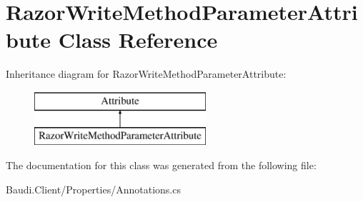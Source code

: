 \hypertarget{class_razor_write_method_parameter_attribute}{}\section{Razor\+Write\+Method\+Parameter\+Attribute Class Reference}
\label{class_razor_write_method_parameter_attribute}
Inheritance diagram for Razor\+Write\+Method\+Parameter\+Attribute\+:\begin{figure}[H]
\begin{center}
\leavevmode
\includegraphics[height=2.000000cm]{class_razor_write_method_parameter_attribute}
\end{center}
\end{figure}


The documentation for this class was generated from the following file\+:\begin{DoxyCompactItemize}
\item 
Baudi.\+Client/\+Properties/Annotations.\+cs\end{DoxyCompactItemize}
